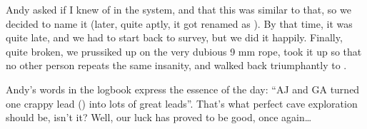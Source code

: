 Andy asked if I knew of  in the system, and that
this was similar to that, so we decided to name it  (later, quite aptly, it got renamed as ). By
that time, it was quite late, and we had to start back to survey, but we
did it happily. Finally, quite broken, we prussiked up on the very
dubious 9 mm rope, took it up so that no other person repeats the same
insanity, and walked back triumphantly to .


Andy's words in the logbook express the essence of the day: ``AJ and GA
turned one crappy lead () into lots of great leads''.
That's what perfect cave exploration should be, isn't it? Well, our luck
has proved to be good, once again\ldots{}






